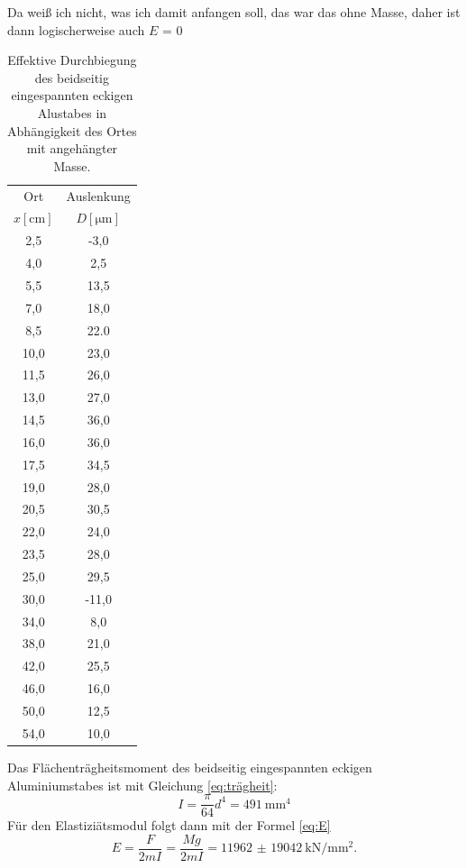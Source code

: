 \documentclass[
  bibliography=totoc,     %
  captions=tableheading,  %
  titlepage=firstiscover, %
]{scrartcl}
\begin{document}
Da weiß ich nicht, was ich damit anfangen soll, das war das ohne Masse, daher
ist dann logischerweise auch $E$ = 0
\begin{table}[H]
    \centering
    \caption{Effektive Durchbiegung des beidseitig eingespannten eckigen Alustabes in Abhängigkeit des Ortes mit angehängter Masse.}
    \begin{tabular}{cc}
        \toprule
        {Ort} & {Auslenkung} \\
        {$x[\si{\centi\metre}]$} & {$D[\si{\micro\metre}]$} \\
        \midrule
      2,5   & -3,0  \\
      4,0   &  2,5  \\
      5,5   &  13,5 \\
      7,0   &  18,0 \\
      8,5   & 22.0 \\
      10,0  & 23,0 \\
      11,5  & 26,0 \\
      13,0  & 27,0 \\
      14,5  & 36,0 \\
      16,0  & 36,0 \\
      17,5  & 34,5 \\
      19,0  & 28,0 \\
      20,5  & 30,5 \\
      22,0  & 24,0 \\
      23,5  & 28,0 \\
      25,0  & 29,5 \\
      30,0  &-11,0 \\
      34,0  & 8,0  \\
      38,0  & 21,0 \\
      42,0  & 25,5 \\
      46,0  & 16,0 \\
      50,0  & 12,5 \\
      54,0  & 10,0 \\
        \bottomrule
    \end{tabular}
    \label{tab3:alueckig}
\end{table}
Das Flächenträgheitsmoment des beidseitig eingespannten eckigen Aluminiumstabes ist mit Gleichung
\ref{eq:trägheit}:
\begin{equation}
    I = \frac{\pi}{64}d^4 = \SI{491}{\milli\metre^4}
\end{equation}
Für den Elastiziätsmodul folgt dann mit der Formel \ref{eq:E}
\begin{equation}
    E = \frac{F}{2mI} = \frac{Mg}{2mI} = \SI{11962(19042)}{\kilo\newton\per\milli\metre\squared}.
\end{equation}
\newpage
\end{document}
